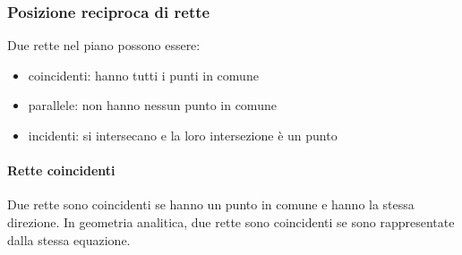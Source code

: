 \documentclass[letterpaper,10pt,italian]{jupyterBook}
\begin{document}
\subsubsection{Posizione reciproca di rette}
\label{\detokenize{ch/analytic_geometry/analytic_geometry_2d/lines:posizione-reciproca-di-rette}}
\sphinxAtStartPar
Due rette nel piano possono essere:
\begin{itemize}
\item {} 
\sphinxAtStartPar
coincidenti: hanno tutti i punti in comune

\item {} 
\sphinxAtStartPar
parallele: non hanno nessun punto in comune

\item {} 
\sphinxAtStartPar
incidenti: si intersecano e la loro intersezione è un punto

\end{itemize}


\paragraph{Rette coincidenti}
\label{\detokenize{ch/analytic_geometry/analytic_geometry_2d/lines:rette-coincidenti}}
\sphinxAtStartPar
Due rette sono coincidenti se hanno un punto in comune e hanno la stessa direzione. In geometria analitica, due rette sono coincidenti se sono rappresentate dalla stessa equazione.
\end{document}
